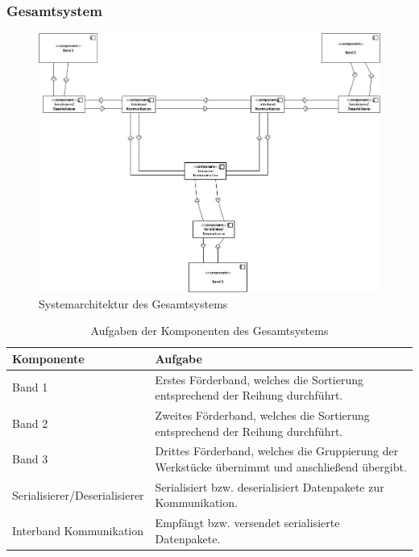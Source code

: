 \documentclass[a4paper, 11pt]{article}
\begin{document}
\newpage

\subsubsection{Gesamtsystem}

\begin{figure}[h]
\centering 
\includegraphics[scale=0.60]{images/SW_Architektur/Gesamtsystem.jpg}
\caption{Systemarchitektur des Gesamtsystems}
\label{archtotal}
\end{figure}

\begin{table}[h]
\center
\begin{tabularx}{\textwidth}{|l|X|}
\hline
\textbf{Komponente}&\textbf{Aufgabe}\\
\hline
Band 1&Erstes Förderband, welches die Sortierung entsprechend der Reihung durchführt.\\
\hline
Band 2&Zweites Förderband, welches die Sortierung entsprechend der Reihung durchführt.\\
\hline
Band 3&Drittes Förderband, welches die Gruppierung der Werkstücke übernimmt und anschließend übergibt.\\
\hline
Serialisierer/Deserialisierer&Serialisiert bzw. deserialisiert Datenpakete zur Kommunikation.\\
\hline
Interband Kommunikation&Empfängt bzw. versendet serialisierte Datenpakete.\\
\hline
\end{tabularx}
\caption{Aufgaben der Komponenten des Gesamtsystems}
\label{archtotalcomp}
\end{table}
\end{document}
